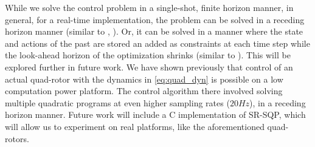 While we solve the control problem in a single-shot, finite horizon manner, in general, for a real-time implementation, the problem can be solved in a receding horizon manner (similar to \cite{PantAMNDM15_Anytime}, \cite{Jain2016}). Or, it can be solved in a manner where the state and actions of the past are stored an added as constraints at each time step while the look-ahead horizon of the optimization shrinks (similar to \cite{Raman14_MPCSTL}). This will be explored further in future work. We have shown previously \cite{PantAMNDM15_Anytime} that control of an actual quad-rotor with the dynamics in \eqref{eq:quad_dyn} is possible on a low computation power platform. The control algorithm there involved solving multiple quadratic programs at even higher sampling rates ($20Hz$), in a receding horizon manner. Future work will include a C implementation of SR-SQP, which will allow us to experiment on real platforms, like the aforementioned quad-rotors.
